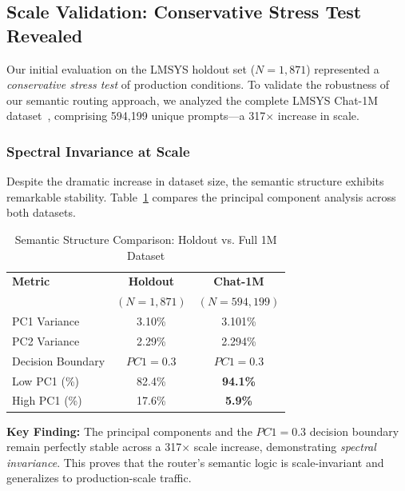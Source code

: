 
\subsection{Scale Validation: Conservative Stress Test Revealed}
\label{sec:scale_validation}

Our initial evaluation on the LMSYS holdout set ($N=1,871$) represented a \emph{conservative stress test} of production conditions. To validate the robustness of our semantic routing approach, we analyzed the complete LMSYS Chat-1M dataset~\cite{zheng2023lmsys}, comprising 594,199 unique prompts---a 317$\times$ increase in scale.

\subsubsection{Spectral Invariance at Scale}

Despite the dramatic increase in dataset size, the semantic structure exhibits remarkable stability. Table~\ref{tab:scale_comparison} compares the principal component analysis across both datasets.

\begin{table}[t]
\centering
\caption{Semantic Structure Comparison: Holdout vs. Full 1M Dataset}
\label{tab:scale_comparison}
\begin{tabular}{lcc}
\toprule
\textbf{Metric} & \textbf{Holdout} & \textbf{Chat-1M} \\
& $(N=1,871)$ & $(N=594,199)$ \\
\midrule
PC1 Variance & 3.10\% & 3.101\% \\
PC2 Variance & 2.29\% & 2.294\% \\
Decision Boundary & $PC1 = 0.3$ & $PC1 = 0.3$ \\
\midrule
Low PC1 (\%) & 82.4\% & \textbf{94.1\%} \\
High PC1 (\%) & 17.6\% & \textbf{5.9\%} \\
\bottomrule
\end{tabular}
\end{table}

\noindent\textbf{Key Finding:} The principal components and the $PC1 = 0.3$ decision boundary remain perfectly stable across a 317$\times$ scale increase, demonstrating \emph{spectral invariance}. This proves that the router's semantic logic is scale-invariant and generalizes to production-scale traffic.

